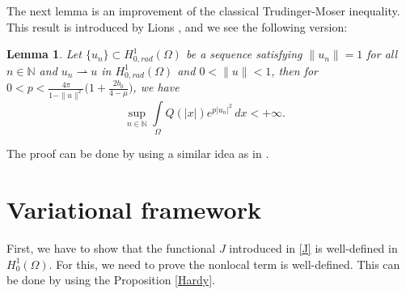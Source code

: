 \documentclass[11pt]{amsart}
\numberwithin{equation}{section}
\newtheorem{lem}[thm]{Lemma}
\newcommand{\h}{H^1_0(\Omega)}
\newcommand{\1}{\frac{1}{2}}
\begin{document}
	The next lemma is an improvement of the classical Trudinger-Moser inequality. This result is introduced by Lions \cite{Lion}, and we see the following version:
	\begin{lem}
		\label{lem2.3}
		Let $\{u_n\} \subset H^1_{0,rad}(\Omega)$ be a sequence satisfying $\|u_n\|= 1$ for all $n\in \mathbb{N}$ and $u_n \rightharpoonup u $ in $H^1_{0,rad}(\Omega)$ and $0< \|u\| <1$, then for $ 0< p<\frac{4\pi}{1- \|u\|^2} \Big(1+ \frac{2b_0}{4-\mu}\Big)$, we have
		\[\sup_{n \in \mathbb{N}} \int\limits_{\Omega} Q(|x|)e^{ p |u_n|^2}  \,dx < +\infty. \quad\]
	\end{lem}
	The proof can be done by using a similar idea as in \cite{O}.
	
	
	\section{Variational framework}
	\label{sec3}
	
	First, we have to show that the functional $J$ introduced in \eqref{J} is well-defined in $\h$. For this, we need to prove the nonlocal term is well-defined. This can be done by using the Proposition \ref{Hardy}.
	
\end{document}
